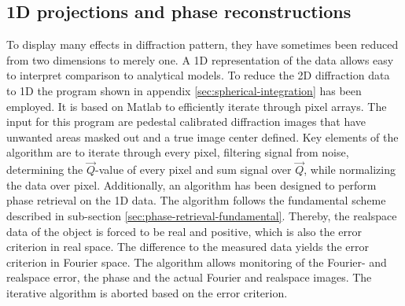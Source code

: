\subsection{1D projections and phase reconstructions}\label{sec:1d-proj-and-phase-reconstruction}
To display many effects in diffraction pattern, they have sometimes been reduced from two dimensions to merely one. A 1D representation of the data allows easy to interpret comparison to analytical models. To reduce the 2D diffraction data to 1D the program shown in appendix \ref{sec:spherical-integration} has been employed. It is based on Matlab to efficiently iterate through pixel arrays. The input for this program are pedestal calibrated diffraction images that have unwanted areas masked out and a true image center defined. Key elements of the algorithm are to iterate through every pixel, filtering signal from noise, determining the $\vec{Q}$-value of every pixel and sum signal over $\vec{Q}$, while normalizing the data over pixel. Additionally, an algorithm has been designed to perform phase retrieval on the 1D data.
The algorithm follows the fundamental scheme described in sub-section \ref{sec:phase-retrieval-fundamental}. Thereby, the realspace data of the object is forced to be real and positive, which is also the error criterion in real space. The difference to the measured data yields the error criterion in Fourier space. The algorithm allows monitoring of the Fourier- and realspace error, the phase and the actual Fourier and realspace images. The iterative algorithm is aborted based on the error criterion.
%
%
%
